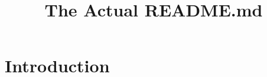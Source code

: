 \documentclass{article}
\title{The Actual README.md}
\author{}
\date{}
\begin{document}
\maketitle

\section{Introduction}
\end{document}
